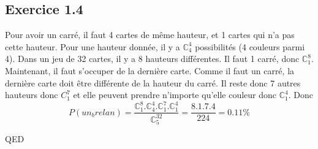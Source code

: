 \documentclass[]{book}
\theoremstyle{definition}
\newcommand{\bb}[1]{\mathbb{#1}}
\newcommand{\C}{\bb{C}}
\begin{document}
\subsection*{Exercice 1.4}
Pour avoir un carr\'e, il faut 4 cartes de m\^eme hauteur, et 1 cartes qui n'a pas cette hauteur. Pour une hauteur donn\'ee, il y a $\C_4^4$ possibilit\'es (4 couleurs parmi 4). Dans un jeu de 32 cartes, il y a 8 hauteurs diff\'erentes. Il faut 1 carr\'e, donc $\C_1^8$. Maintenant, il faut s'occuper de la derni\`ere carte. Comme il faut un carr\'e, la derni\`ere carte doit \^etre diff\'erente de la hauteur du carr\'e. Il reste donc 7 autres hauteurs donc $C_1^7$ et elle peuvent prendre n'importe qu'elle couleur donc $\C_1^4$. Donc
$$P(un_brelan) = \frac{\C_1^8.\C_4^4.\C_1^7.\C_1^4}{\C_5^{32}} = \frac{8.1.7.4}{224} = 0.11\%$$



QED
\end{document}
